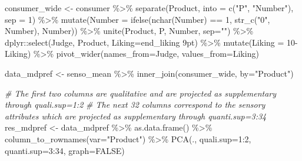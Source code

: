 \documentclass[
]{book}
\newenvironment{Shaded}{\begin{snugshade}}{\end{snugshade}}
\newcommand{\AttributeTok}[1]{\textcolor[rgb]{0.77,0.63,0.00}{#1}}
\newcommand{\CommentTok}[1]{\textcolor[rgb]{0.56,0.35,0.01}{\textit{#1}}}
\newcommand{\ConstantTok}[1]{\textcolor[rgb]{0.00,0.00,0.00}{#1}}
\newcommand{\DecValTok}[1]{\textcolor[rgb]{0.00,0.00,0.81}{#1}}
\newcommand{\FunctionTok}[1]{\textcolor[rgb]{0.00,0.00,0.00}{#1}}
\newcommand{\NormalTok}[1]{#1}
\newcommand{\OtherTok}[1]{\textcolor[rgb]{0.56,0.35,0.01}{#1}}
\newcommand{\SpecialCharTok}[1]{\textcolor[rgb]{0.00,0.00,0.00}{#1}}
\newcommand{\StringTok}[1]{\textcolor[rgb]{0.31,0.60,0.02}{#1}}
\begin{document}
\begin{Shaded}
\begin{Highlighting}[]
\NormalTok{consumer\_wide }\OtherTok{\textless{}{-}}\NormalTok{ consumer }\SpecialCharTok{\%\textgreater{}\%} 
  \FunctionTok{separate}\NormalTok{(Product, }\AttributeTok{into =} \FunctionTok{c}\NormalTok{(}\StringTok{"P"}\NormalTok{, }\StringTok{"Number"}\NormalTok{), }\AttributeTok{sep =} \DecValTok{1}\NormalTok{) }\SpecialCharTok{\%\textgreater{}\%} 
  \FunctionTok{mutate}\NormalTok{(}\AttributeTok{Number =} \FunctionTok{ifelse}\NormalTok{(}\FunctionTok{nchar}\NormalTok{(Number) }\SpecialCharTok{==} \DecValTok{1}\NormalTok{, }\FunctionTok{str\_c}\NormalTok{(}\StringTok{"0"}\NormalTok{, Number), Number)) }\SpecialCharTok{\%\textgreater{}\%} 
  \FunctionTok{unite}\NormalTok{(Product, P, Number, }\AttributeTok{sep=}\StringTok{""}\NormalTok{) }\SpecialCharTok{\%\textgreater{}\%} 
\NormalTok{  dplyr}\SpecialCharTok{::}\FunctionTok{select}\NormalTok{(Judge, Product, }\AttributeTok{Liking=}\StringTok{\textasciigrave{}}\AttributeTok{end\_liking 9pt}\StringTok{\textasciigrave{}}\NormalTok{) }\SpecialCharTok{\%\textgreater{}\%} 
  \FunctionTok{mutate}\NormalTok{(}\AttributeTok{Liking =} \DecValTok{10}\SpecialCharTok{{-}}\NormalTok{Liking) }\SpecialCharTok{\%\textgreater{}\%} 
  \FunctionTok{pivot\_wider}\NormalTok{(}\AttributeTok{names\_from=}\NormalTok{Judge, }\AttributeTok{values\_from=}\NormalTok{Liking)}

\NormalTok{data\_mdpref }\OtherTok{\textless{}{-}}\NormalTok{ senso\_mean }\SpecialCharTok{\%\textgreater{}\%} 
  \FunctionTok{inner\_join}\NormalTok{(consumer\_wide, }\AttributeTok{by=}\StringTok{"Product"}\NormalTok{)}

\CommentTok{\# The first two columns are qualitative and are projected as supplementary through quali.sup=1:2}
\CommentTok{\# The next 32 columns correspond to the sensory attributes which are projected as supplementary through quanti.sup=3:34}
\NormalTok{res\_mdpref }\OtherTok{\textless{}{-}}\NormalTok{ data\_mdpref }\SpecialCharTok{\%\textgreater{}\%} 
  \FunctionTok{as.data.frame}\NormalTok{() }\SpecialCharTok{\%\textgreater{}\%} 
  \FunctionTok{column\_to\_rownames}\NormalTok{(}\AttributeTok{var=}\StringTok{"Product"}\NormalTok{) }\SpecialCharTok{\%\textgreater{}\%} 
  \FunctionTok{PCA}\NormalTok{(., }\AttributeTok{quali.sup=}\DecValTok{1}\SpecialCharTok{:}\DecValTok{2}\NormalTok{, }\AttributeTok{quanti.sup=}\DecValTok{3}\SpecialCharTok{:}\DecValTok{34}\NormalTok{, }\AttributeTok{graph=}\ConstantTok{FALSE}\NormalTok{)}


\end{Highlighting}
\end{Shaded}
\end{document}
